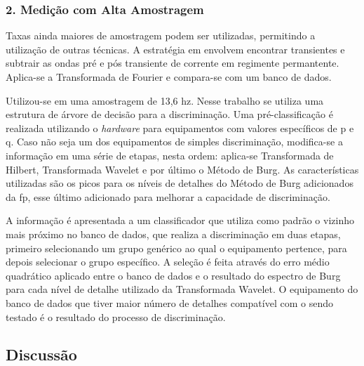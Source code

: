 \subsubsection{2. Medição com Alta Amostragem}
\label{top:nilm_alta_am}

Taxas ainda maiores de amostragem podem ser utilizadas, permitindo a utilização
de outras técnicas. A estratégia em
\cite{nilm_laughman_continuous_variables_2003_9} envolvem encontrar
transientes e subtrair as ondas pré e pós transiente de corrente em
regimente permantente. Aplica-se a Transformada de Fourier e
compara-se com um banco de dados. 

Utilizou-se em \cite{nilm_coppe_nascimento} uma amostragem de 13,6
\acrshort{hz}. Nesse trabalho se utiliza uma estrutura de árvore de
decisão para a discriminação. Uma pré-classificação é realizada
utilizando o \emph{hardware} para equipamentos com valores específicos
de \gls{p} e \gls{q}. Caso não seja um dos equipamentos de simples
discriminação, modifica-se a informação em uma série de etapas, nesta
ordem: aplica-se Transformada de Hilbert, Transformada Wavelet e por
último o Método de Burg. As características utilizadas são os picos 
para os níveis de detalhes do Método de Burg adicionados da \gls{fp},
esse último adicionado para melhorar a capacidade de discriminação.

A informação é apresentada a um
classificador que utiliza como padrão o vizinho mais próximo no banco
de dados, que realiza a discriminação em duas etapas, primeiro
selecionando um grupo genérico ao qual o equipamento pertence, para
depois selecionar o grupo específico. A seleção é feita através do
erro médio quadrático aplicado entre o banco de dados e o resultado do
espectro de Burg para cada nível de detalhe utilizado da Transformada
Wavelet. O equipamento do banco de dados que tiver maior número de
detalhes compatível com o sendo testado é o resultado do processo de
discriminação.



\subsection{Discussão}
\label{ssec:nilm_mundo_padroes}


